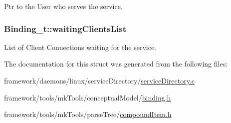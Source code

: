 Ptr to the User who serves the service. 

\subsubsection[{\texorpdfstring{waiting\+Clients\+List}{waitingClientsList}}]{ Binding\+\_\+t\+::waiting\+Clients\+List}\hypertarget{struct_binding__t_a8b0a69ba3203735a21df1476f8d9f32d}{}\label{struct_binding__t_a8b0a69ba3203735a21df1476f8d9f32d}


List of Client Connections waiting for the service. 



The documentation for this struct was generated from the following files\+:\begin{DoxyCompactItemize}
\item 
framework/daemons/linux/service\+Directory/\hyperlink{service_directory_8c}{service\+Directory.\+c}\item 
framework/tools/mk\+Tools/conceptual\+Model/\hyperlink{binding_8h}{binding.\+h}\item 
framework/tools/mk\+Tools/parse\+Tree/\hyperlink{compound_item_8h}{compound\+Item.\+h}\end{DoxyCompactItemize}
